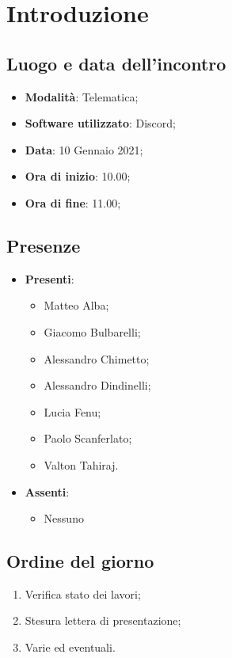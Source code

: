 \documentclass[]{article}
\begin{document}
	
	
	
	\newpage
	
	
		\section{Introduzione}
		\subsection{Luogo e data dell'incontro}
		\begin{itemize}
			\item \textbf{Modalità}: Telematica;
			\item \textbf{Software utilizzato}: Discord;
			\item \textbf{Data}: 10 Gennaio 2021;
			\item \textbf{Ora di inizio}: 10.00;
			\item \textbf{Ora di fine}: 11.00;
		\end{itemize}

		\subsection{Presenze}
		\begin{itemize}
			\item \textbf{Presenti}:
			\begin{itemize}
				\item Matteo Alba;
				\item Giacomo Bulbarelli;
				\item Alessandro Chimetto;
				\item Alessandro Dindinelli;
				\item Lucia Fenu;
				\item Paolo Scanferlato;
				\item Valton Tahiraj.
			\end{itemize}
			\item \textbf{Assenti}:
			\begin{itemize}
				\item Nessuno
			\end{itemize}
		\end{itemize}


		\subsection{Ordine del giorno}
		\begin{enumerate}
			\item Verifica stato dei lavori;
			\item Stesura lettera di presentazione;
			\item Varie ed eventuali.
		\end{enumerate}
\end{document}
